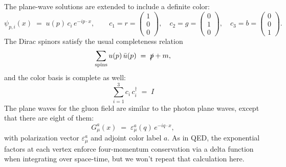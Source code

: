 \documentclass[12pt]{article}
\begin{document}
The plane-wave solutions are extended to include a definite color:
\begin{equation*}
    \psi_{p, i}(x) \;=\; u(p)\, c_i\, e^{-i p \cdot x},
    \qquad
    c_1 = r = \begin{pmatrix} 1 \\ 0 \\ 0 \end{pmatrix},\quad
    c_2 = g = \begin{pmatrix} 0 \\ 1 \\ 0 \end{pmatrix},\quad
    c_3 = b = \begin{pmatrix} 0 \\ 0 \\ 1 \end{pmatrix}.
\end{equation*}
The Dirac spinors satisfy the usual completeness relation
\begin{equation*}
    \sum_\text{spins} u(p)\, \bar u(p) \;=\; \slashed{p} + m,
\end{equation*}
and the color basis is complete as well:
\begin{equation*}
    \sum_{i=1}^{3} c_i\, c_i^\dagger \;=\; I
\end{equation*}
The plane waves for the gluon field are similar to the photon plane waves, except that there are eight of them:
\begin{equation*}
    G^a_\mu(x) \;=\; \varepsilon^a_\mu(q)\, e^{-i q \cdot x},
\end{equation*}
with polarization vector $\varepsilon^a_\mu$ and adjoint color label
$a$. As in QED, the exponential factors at each vertex enforce
four-momentum conservation via a delta function when integrating over
space-time, but we won't repeat that calculation here.
\end{document}

